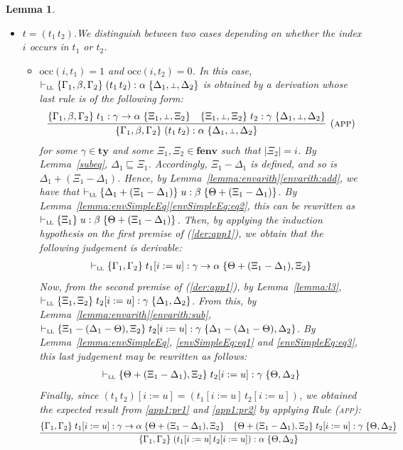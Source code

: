 \documentclass[submission,creativecommons]{eptcs}
\newtheorem{lemma}{Lemma}
\newcommand{\mybox}{\raisebox{3.5pt}{\framebox[7pt]{\rule{0mm}{0.3pt}}}}
\def\qed{\ifmmode\mybox\else{\unskip\nobreak\hfil
\penalty50\hskip1em\null\nobreak\hfil\mybox
\parfillskip=0pt\finalhyphendemerits=0\endgraf}\fi}
\newenvironment{proof}{%

\vspace{.7ex}
\noindent{\it Proof.} \rm}{\qed}
\newcommand{\bt}{{\scriptstyle\bot}}
\newcommand{\iapp}[2]{(#1\,#2)}
\newcommand{\sbstt}[3]{#1[#2 := #3]}
\newcommand{\tytm}[4]{\{#1\}\;#2:#3\;\{#4\}}
\newcommand{\der}[1]{\vdash_{#1}}
\newcommand{\Sll}{{\textsc{ll}}}
\newcommand{\ty}{\mathord{\mathbf{ty}}}
\newcommand{\fenv}{\mathord{\mathbf{fenv}}}
\newcommand{\occ}[2]{\mathord{\mathrm{occ}}(#1,#2)}
\begin{document}
\begin{lemma}
\begin{proof}
\begin{itemize}
\item $t = \iapp{t_1}{t_2}$.\quad We distinguish between two cases depending on whether the index $i$ occurs in $t_1$ or $t_2$.
\begin{itemize}
\item $\occ{i}{t_1} = 1$ and $\occ{i}{t_2} = 0$.\quad
In this case, $\der{\Sll}{\tytm{\Gamma_1, \beta, \Gamma_2}{\iapp{t_1}{t_2}}{\alpha}{\Delta_1, \bt, \Delta_2}}$ is
obtained by a derivation whose last rule is of the following form:
\begin{align}\label{der:app1}
\infer[\mbox{(\textsc{app})}]{
\tytm{\Gamma_1, \beta, \Gamma_2}{\iapp{t_1}{t_2}}{\alpha}{\Delta_1, \bt, \Delta_2}
}{
\tytm{\Gamma_1, \beta, \Gamma_2}{t_1}{\gamma \rightarrow \alpha}{\Xi_1, \bt, \Xi_2}
&
\tytm{\Xi_1, \bt, \Xi_2}{t_2}{\gamma}{\Delta_1, \bt, \Delta_2}
}
\end{align}
for some $\gamma\in\ty$ and some $\Xi_1, \Xi_2\in\fenv$ such that $|\Xi_2|=i$.
By Lemma~\ref{subeq}, $\Delta_1\sqsubseteq\Xi_1$. Accordingly, $\Xi_1-\Delta_1$ is defined, and so is
$\Delta_1+(\Xi_1-\Delta_1)$.  Hence, by Lemma~\ref{lemma:envarith}\ref{envarith:add}, we have that
$\der{\Sll}\tytm{\Delta_1+(\Xi_1-\Delta_1)}{u}{\beta}{\Theta+(\Xi_1-\Delta_1)}$.
By Lemma~\ref{lemma:envSimpleEq}\ref{envSimpleEq:eq2}, this can be rewritten as
$\der{\Sll}\tytm{\Xi_1}{u}{\beta}{\Theta+(\Xi_1-\Delta_1)}$.
Then, by applying the induction hypothesis on the first premise of (\ref{der:app1}), we obtain that the following judgement
is derivable:
\begin{align}\label{app1:pr1}
\der{\Sll}\tytm{\Gamma_1, \Gamma_2}{\sbstt{t_1}{i}{u}}{\gamma \rightarrow \alpha}{\Theta + (\Xi_1 - \Delta_1), \Xi_2}
\end{align}
Now, from the second premise of (\ref{der:app1}), by Lemma~\ref{lemma:l3},
$\der{\Sll}{\tytm{\Xi_1, \Xi_2}{\sbstt{t_2}{i}{u}}{\gamma}{\Delta_1, \Delta_2}}$.
From this, by Lemma~\ref{lemma:envarith}\ref{envarith:sub},
$\der{\Sll}{\tytm{\Xi_1-(\Delta_1 - \Theta), \Xi_2}{\sbstt{t_2}{i}{u}}{\gamma}{\Delta_1-(\Delta_1 - \Theta), \Delta_2}}$.
By Lemma~\ref{lemma:envSimpleEq}, \ref{envSimpleEq:eq1} and \ref{envSimpleEq:eq3}, this last judgement may be rewritten as
follows:
\begin{align}\label{app1:pr2}
  \der{\Sll}{\tytm{\Theta + (\Xi_1-\Delta_1), \Xi_2}{\sbstt{t_2}{i}{u}}{\gamma}{\Theta, \Delta_2}}
\end{align}
Finally, since $\sbstt{\iapp{t_1}{t_2}}{i}{u} = \iapp{\sbstt{t_1}{i}{u}}{\sbstt{t_2}{i}{u}}$,
we obtained the expected result from \ref{app1:pr1} and \ref{app1:pr2} by applying Rule (\textsc{app}):
\begin{align*}
\infer{
\tytm{\Gamma_1, \Gamma_2}{\iapp{\sbstt{t_1}{i}{u}}{\sbstt{t_2}{i}{u}}}{\alpha}{\Theta, \Delta_2}
}{
\tytm{\Gamma_1, \Gamma_2}{\sbstt{t_1}{i}{u}}{\gamma \rightarrow \alpha}{\Theta + (\Xi_1 - \Delta_1), \Xi_2}
&
\tytm{\Theta + (\Xi_1-\Delta_1), \Xi_2}{\sbstt{t_2}{i}{u}}{\gamma}{\Theta, \Delta_2}
}
\end{align*}


\end{itemize}
\end{itemize}
\end{proof}
\end{lemma}
\end{document}
